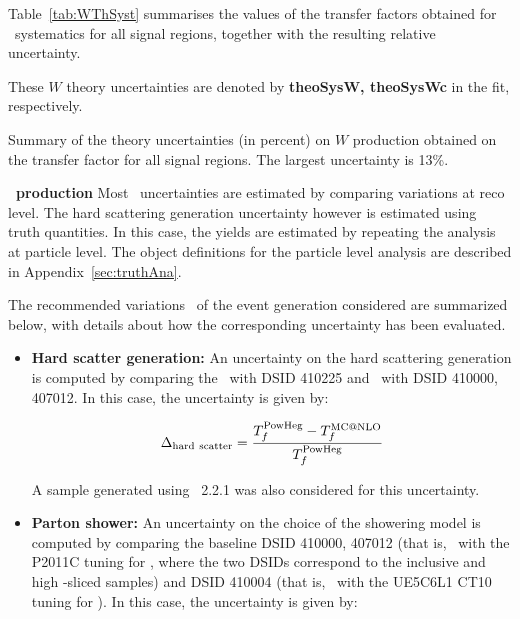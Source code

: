 \begin{description}
Table~\ref{tab:WThSyst} summarises the values of the transfer factors obtained for \sherpa\ systematics for all signal regions, together with the resulting relative uncertainty.

  These $W$ theory uncertainties are denoted by {\bf theoSysW, theoSysWc} in the fit, respectively.


  \begin{table}[!h]
    \begin{center} \footnotesize

    \end{center}
    \caption{Summary of the theory uncertainties (in percent) on $W$ production obtained on the transfer factor for all signal regions. 
      The largest uncertainty is 13\%. }
    \label{tab:WThSyst}
  \end{table}         

\item{\boldmath \bf \ttbar\ production} Most \ttbar\ uncertainties are estimated by comparing variations at reco level. The hard scattering generation uncertainty however is estimated using truth quantities. In this case, the yields are estimated by repeating the analysis at particle level. The object definitions for the particle level analysis are described in Appendix~\ref{sec:truthAna}.

  The recommended variations~\cite{ATLAS:ttbarTheoryUnc} of the event generation considered are summarized below, with details about how the corresponding uncertainty has been evaluated.  

  \begin{itemize}
  \item{\bf Hard scatter generation:} An uncertainty on the hard scattering generation is computed by comparing the \mcatnlo\pythia\ with DSID 410225 and \powheg\pythia\ with DSID 410000, 407012. In this case, the uncertainty is given by:

    \begin{eqnarray}
      \Delta_{\mathrm{hard~scatter}} = \frac{T_f^{\mathrm{PowHeg}} - T_f^{\mathrm{MC@NLO}}}{T_f^{\mathrm{PowHeg}}}
    \end{eqnarray}

  A sample generated using \sherpa\ 2.2.1 was also considered for this uncertainty.

  \item{\bf Parton shower:} An uncertainty on the choice of the showering model is computed by comparing the baseline DSID 410000, 407012 (that is, \powheg\pythia\ with the P2011C tuning for \pythia, where the two DSIDs correspond to the inclusive and high \met -sliced samples) and DSID 410004 (that is, \powheg\herwigpp\ with the UE5C6L1 CT10 tuning for \herwigpp). In this case, the uncertainty is given by:


\end{itemize}
\end{description}
